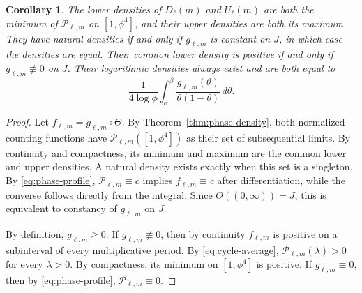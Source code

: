 \documentclass[11pt]{amsart}
\newtheorem{corollary}[theorem]{Corollary}
\theoremstyle{definition}
\begin{document}
\begin{corollary}\label{cor:density-consequences}
The lower densities of $D_\ell(m)$ and $U_\ell(m)$ are both the minimum
of $\mathcal P_{\ell,m}$ on $[1,\phi^4]$, and their upper densities are
both its maximum. They have natural densities if and only if
$g_{\ell,m}$ is constant on $J$, in which case the densities are equal.
Their common lower density is positive if and only if
$g_{\ell,m}\not\equiv0$ on $J$. Their logarithmic densities always
exist and are both equal to
\begin{equation}\label{eq:log-density}
 \frac1{4\log\phi}\int_\alpha^\beta
 \frac{g_{\ell,m}(\theta)}{\theta(1-\theta)}\,d\theta.
\end{equation}
\end{corollary}

\begin{proof}
Let $f_{\ell,m}=g_{\ell,m}\circ\Theta$. By
Theorem~\ref{thm:phase-density}, both normalized counting functions
have $\mathcal P_{\ell,m}([1,\phi^4])$ as their set of subsequential
limits. By continuity and compactness, its minimum and maximum are the
common lower and upper densities. A natural density exists exactly when
this set is a singleton. By \eqref{eq:phase-profile},
$\mathcal P_{\ell,m}\equiv c$ implies $f_{\ell,m}\equiv c$ after
differentiation, while the converse follows directly from the integral.
Since $\Theta((0,\infty))=J$, this is equivalent to constancy of
$g_{\ell,m}$ on $J$.

By definition, $g_{\ell,m}\geq0$. If $g_{\ell,m}\not\equiv0$, then by
continuity $f_{\ell,m}$ is positive on a subinterval of every
multiplicative period. By \eqref{eq:cycle-average},
$\mathcal P_{\ell,m}(\lambda)>0$ for every $\lambda>0$. By compactness,
its minimum on $[1,\phi^4]$ is positive. If
$g_{\ell,m}\equiv0$, then by \eqref{eq:phase-profile},
$\mathcal P_{\ell,m}\equiv0$.


\end{proof}
\end{document}
